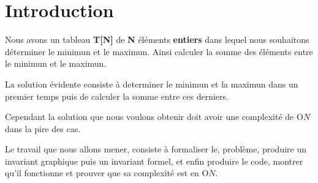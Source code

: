 \section{Introduction}\label{introduction}

\par
Nous avons un tableau \textbf{T[N]} de \textbf{N} éléments \textbf{entiers} dans lequel nous souhaitons déterminer le minimun et
le maximun. Ainsi calculer la somme des éléments entre le minimun et le maximun. 
\par

La solution évidente consiste à determiner le minimun et la maximun dans un premier temps
puis de calculer la somme entre ces derniers.
\par

Cependant la solution que nous voulons obtenir doit avoir une complexité de O\(N\) dans 
la pire des cas. 
\par

Le travail que nous allons mener, consiste à formaliser le, problème, produire un invariant 
graphique puis un invariant formel, et enfin produire le code, montrer qu'il fonctionne et 
prouver que sa complexité est en O\(N\).